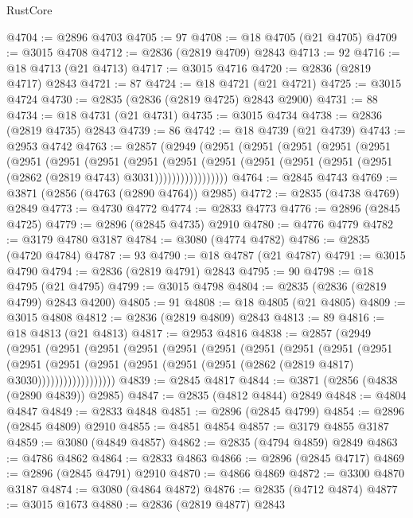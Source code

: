 \begin{lexlean}{RustCore}
\begin{coremodule}
@4704 := @2896 @4703
@4705 := 97
@4708 := @18 @4705 (@21 @4705)
@4709 := @3015 @4708
@4712 := @2836 (@2819 @4709) @2843
@4713 := 92
@4716 := @18 @4713 (@21 @4713)
@4717 := @3015 @4716
@4720 := @2836 (@2819 @4717) @2843
@4721 := 87
@4724 := @18 @4721 (@21 @4721)
@4725 := @3015 @4724
@4730 := @2835 (@2836 (@2819 @4725) @2843 @2900)
@4731 := 88
@4734 := @18 @4731 (@21 @4731)
@4735 := @3015 @4734
@4738 := @2836 (@2819 @4735) @2843
@4739 := 86
@4742 := @18 @4739 (@21 @4739)
@4743 := @2953 @4742
@4763 := @2857
    (@2949
      (@2951
        (@2951
          (@2951
            (@2951
              (@2951
                (@2951
                  (@2951
                    (@2951
                      (@2951
                        (@2951
                          (@2951
                            (@2951 (@2951 (@2951 (@2951 (@2862 (@2819 @4743) @3031)))))))))))))))))
@4764 := @2845 @4743
@4769 := @3871 (@2856 (@4763 (@2890 @4764)) @2985)
@4772 := @2835 (@4738 @4769) @2849
@4773 := @4730 @4772
@4774 := @2833 @4773
@4776 := @2896 (@2845 @4725)
@4779 := @2896 (@2845 @4735) @2910
@4780 := @4776 @4779
@4782 := @3179 @4780 @3187
@4784 := @3080 (@4774 @4782)
@4786 := @2835 (@4720 @4784)
@4787 := 93
@4790 := @18 @4787 (@21 @4787)
@4791 := @3015 @4790
@4794 := @2836 (@2819 @4791) @2843
@4795 := 90
@4798 := @18 @4795 (@21 @4795)
@4799 := @3015 @4798
@4804 := @2835 (@2836 (@2819 @4799) @2843 @4200)
@4805 := 91
@4808 := @18 @4805 (@21 @4805)
@4809 := @3015 @4808
@4812 := @2836 (@2819 @4809) @2843
@4813 := 89
@4816 := @18 @4813 (@21 @4813)
@4817 := @2953 @4816
@4838 := @2857
    (@2949
      (@2951
        (@2951
          (@2951
            (@2951
              (@2951
                (@2951
                  (@2951
                    (@2951
                      (@2951
                        (@2951
                          (@2951
                            (@2951
                              (@2951
                                (@2951 (@2951 (@2951 (@2862 (@2819 @4817) @3030))))))))))))))))))
@4839 := @2845 @4817
@4844 := @3871 (@2856 (@4838 (@2890 @4839)) @2985)
@4847 := @2835 (@4812 @4844) @2849
@4848 := @4804 @4847
@4849 := @2833 @4848
@4851 := @2896 (@2845 @4799)
@4854 := @2896 (@2845 @4809) @2910
@4855 := @4851 @4854
@4857 := @3179 @4855 @3187
@4859 := @3080 (@4849 @4857)
@4862 := @2835 (@4794 @4859) @2849
@4863 := @4786 @4862
@4864 := @2833 @4863
@4866 := @2896 (@2845 @4717)
@4869 := @2896 (@2845 @4791) @2910
@4870 := @4866 @4869
@4872 := @3300 @4870 @3187
@4874 := @3080 (@4864 @4872)
@4876 := @2835 (@4712 @4874)
@4877 := @3015 @1673
@4880 := @2836 (@2819 @4877) @2843

\end{coremodule}
\end{lexlean}
